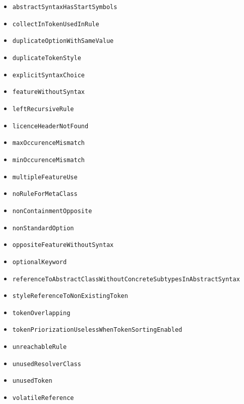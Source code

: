 \begin{itemize}
\item \texttt{abstractSyntaxHasStartSymbols}
\item \texttt{collectInTokenUsedInRule}
\item \texttt{duplicateOptionWithSameValue}
\item \texttt{duplicateTokenStyle}
\item \texttt{explicitSyntaxChoice}
\item \texttt{featureWithoutSyntax}
\item \texttt{leftRecursiveRule}
\item \texttt{licenceHeaderNotFound}
\item \texttt{maxOccurenceMismatch}
\item \texttt{minOccurenceMismatch}
\item \texttt{multipleFeatureUse}
\item \texttt{noRuleForMetaClass}
\item \texttt{nonContainmentOpposite}
\item \texttt{nonStandardOption}
\item \texttt{oppositeFeatureWithoutSyntax}
\item \texttt{optionalKeyword}
\item \texttt{referenceToAbstractClassWithoutConcreteSubtypesInAbstractSyntax}
\item \texttt{styleReferenceToNonExistingToken}
\item \texttt{tokenOverlapping}
\item \texttt{tokenPriorizationUselessWhenTokenSortingEnabled}
\item \texttt{unreachableRule}
\item \texttt{unusedResolverClass}
\item \texttt{unusedToken}
\item \texttt{volatileReference}
\end{itemize}
